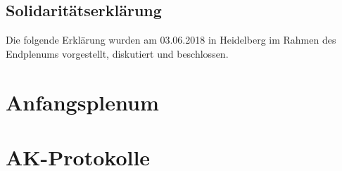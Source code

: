\documentclass[ngerman, 11pt, openany]{scrbook}
\begin{document}
  \section{Solidaritätserklärung}
    Die folgende Erklärung wurden am 03.06.2018 in Heidelberg im Rahmen des Endplenums
    vorgestellt, diskutiert und beschlossen.

\chapter{Anfangsplenum}
  \minitoc
  

\chapter{AK-Protokolle}
  
  
  
  
  
  
  
  
  
  
  
  
  
  
  
  
  
  
  
  
  
  
  
  
  
  
  
  
  
  
  
  
  
  
  
  
  
\end{document}
